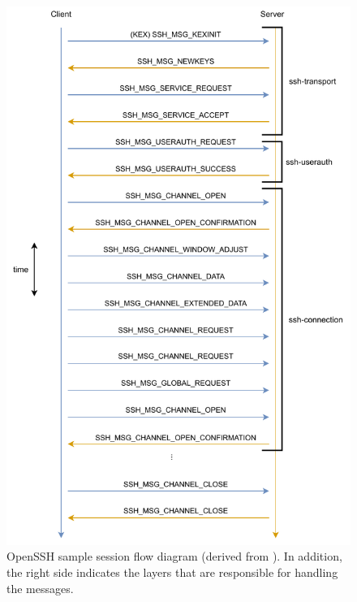 \begin{figure}
    \centering
    \includegraphics{figures/ssh-flow-diagram.pdf}
    \caption[OpenSSH sample session flow diagram]{
        OpenSSH sample session flow diagram (derived from \cite{openssh2007}).
        In addition, the right side indicates the layers that are responsible for handling the messages.
    }
    \label{fig:openssh-flow-diagram}
\end{figure}